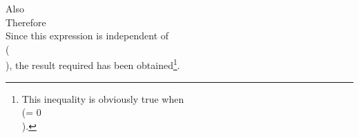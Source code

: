 Also
\\[ \begin{align*}
  \sum_{n=s+1}^{\infty}
  \left| \, 
    f_{n+1}(\alpha) - f_{n}(\alpha)
   \, \right| 
  =&
  \sum_{n=s+1}^{\infty}
  \left| \, 
    \left\{
      \frac{\sin^{2} n\alpha}{\alpha^{2}}
      \left(
        \frac{1}{n^{2}}
        -
        \frac{1}{(n+1)^{2}}
      \right)
    \right\}
    +
    \frac{\sin^{2} n\alpha - \sin^{2} (n+1)\alpha }{(n+1)^{2} \alpha^{2}}
   \, \right| 
  \\
  \leq &
  \sum_{n=s+1}^{\infty}
  \frac{1}{\alpha^{2}}
  \left(
    \frac{1}{n^{2}}
    -
    \frac{1}{ (n+1)^{2} }
  \right)
  +
  \sum_{n=s}^{\infty}
  \frac{\left| \, 
      \sin^{2} n\alpha - \sin^{2} (n+1)\alpha
     \, \right| }{ (n+1)^{2} \alpha^{2} }
  \\
  \leq &
  \frac{1}{ (s^{2} + 1)^{2} \alpha^{2} }
  +
  \sum_{n=s+1}^{\infty}
  \frac{\left| \, 
      \sin \alpha \sin (2n+1)\alpha
     \, \right| }{ (n^{2} + 1)^{2} \alpha^{2} }
  \\
  \leq &
  \frac{1}{ (s^{2} + 1)^{2} \alpha^{2} }
  +
  \frac{\left| \, \sin \alpha \, \right| }{\alpha^{2}}
  \sum_{n=s+1}^{\infty}
  \frac{1}{(n+1)^{2}}
  \\
  \leq &
  \frac{1}{\pi^{2}}
  +
  \frac{\left| \, \sin \alpha \, \right| }{\alpha^{2}}
  \! \int_{s}^{\infty}\!
  \frac{\, d x}{(x+1)^{2}}
  \\
  \leq &
  \frac{1}{\pi^{2}}
  +
  \frac{1}{(s+1) \alpha}.
\end{align*} \\]

Therefore
\\[ \begin{align*}
  \sum_{n=1}^{\infty}
  \left| \, 
    f_{n+1}(\alpha) - f_{n}(\alpha)
   \, \right| 
  \leq &
  \frac{\sin^{2} \alpha}{\alpha^{2}}
  -
  \frac{\sin^{2} s\alpha}{s^{2}\alpha^{2}}
  +
  \left(
    \frac{\sin^{2} s\alpha}{s^{2}\alpha^{2}}
    +
    \frac{\sin^{2} (s+1)\alpha}{(s+1)^{2}\alpha^{2}}
  \right)
  + \frac{1}{\pi^{2}} + \frac{1}{\pi}.
  \\
  \leq &
  1 + \frac{1}{\pi} + \frac{2}{\pi^{2}}.
\end{align*} \\]

Since this expression is independent of \\(\alpha\\), the result required has
been obtained\footnote{This inequality is obviously true when \\(\alpha = 0\\).}.

